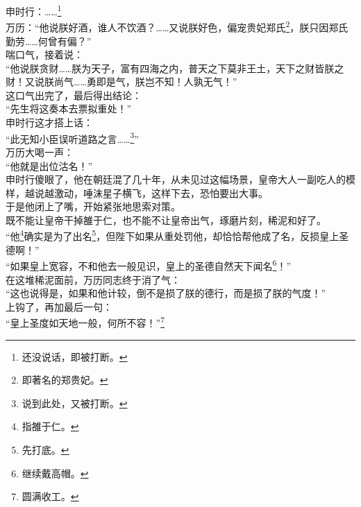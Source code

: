 \begin{multicols}{\theparacolNo}
申时行：……\footnote{还没说话，即被打断。}\\

万历：“他说朕好酒，谁人不饮酒？……又说朕好色，偏宠贵妃郑氏\footnote{即著名的郑贵妃。}，朕只因郑氏勤劳……何曾有偏？”\\

喘口气，接着说：\\

“他说朕贪财……朕为天子，富有四海之内，普天之下莫非王土，天下之财皆朕之财！又说朕尚气……勇即是气，朕岂不知！人孰无气！”\\

这口气出完了，最后得出结论：\\

“先生将这奏本去票拟重处！”\\

申时行这才搭上话：\\

“此无知小臣误听道路之言……\footnote{说到此处，又被打断。}”\\

万历大喝一声：\\

“他就是出位沽名！”\\

申时行傻眼了，他在朝廷混了几十年，从未见过这幅场景，皇帝大人一副吃人的模样，越说越激动，唾沫星子横飞，这样下去，恐怕要出大事。\\

于是他闭上了嘴，开始紧张地思索对策。\\

既不能让皇帝干掉雒于仁，也不能不让皇帝出气，琢磨片刻，稀泥和好了。\\

“他\footnote{指雒于仁。}确实是为了出名\footnote{先打底。}，但陛下如果从重处罚他，却恰恰帮他成了名，反损皇上圣德啊！”\\

“如果皇上宽容，不和他去一般见识，皇上的圣德自然天下闻名\footnote{继续戴高帽。}！”\\

在这堆稀泥面前，万历同志终于消了气：\\

“这也说得是，如果和他计较，倒不是损了朕的德行，而是损了朕的气度！”\\

上钩了，再加最后一句：\\

“皇上圣度如天地一般，何所不容！”\footnote{圆满收工。}\\


\end{multicols}
